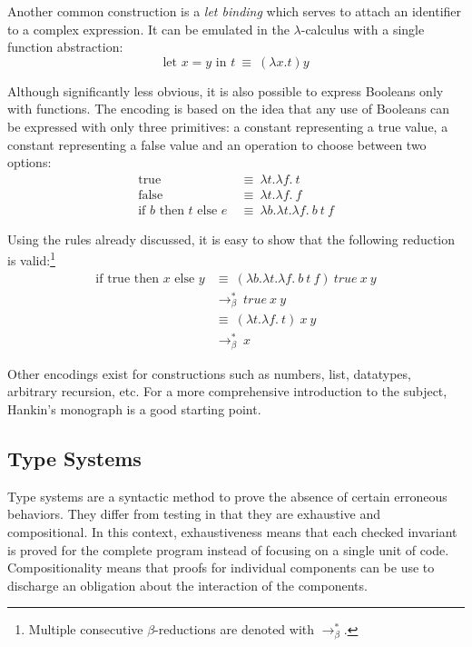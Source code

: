 Another common construction is a \emph{let binding} which serves to attach an identifier to a
complex expression. It can be emulated in the $\lambda$-calculus with a single function abstraction:
\begin{displaymath}
  \text{let } x = y \text{ in } t \: \equiv \: (\lambda x. t) y
\end{displaymath}

Although significantly less obvious, it is also possible to express Booleans only with functions.
The encoding is based on the idea that any use of Booleans can be expressed with only three
primitives: a constant representing a true value, a constant representing a false value and an
operation to choose between two options:
\begin{align*}
  \text{true}
    & \: \equiv \: \lambda t. \lambda f. \ t \\
  \text{false}
    & \: \equiv \: \lambda t. \lambda f. \ f \\
  \text{if } b \text{ then } t \text{ else } e
    & \: \equiv \: \lambda b. \lambda t. \lambda f. \ b \ t \ f
\end{align*}

Using the rules already discussed, it is easy to show that the following reduction is
valid:\footnote{Multiple consecutive $\beta$-reductions are denoted with $\to_\beta^*$.}
\begin{align*}
  \text{if true then } x \text{ else } y
    & \equiv \: (\lambda b. \lambda t. \lambda f. \ b \ t \ f) \ true \ x \ y \\
    & \to_\beta^* \: true \ x \ y \\
    & \equiv \: (\lambda t. \lambda f. \ t) \ x \ y \\
    & \to_\beta^* \: x
\end{align*}

Other encodings exist for constructions such as numbers, list, datatypes, arbitrary recursion, etc.
For a more comprehensive introduction to the subject, Hankin's monograph \cite{hankin-2004-ILCCS} is
a good starting point.

\subsection{Type Systems}

Type systems are a syntactic method to prove the absence of certain erroneous behaviors. They differ
from testing in that they are exhaustive and compositional. In this context, exhaustiveness means
that each checked invariant is proved for the complete program instead of focusing on a single unit
of code. Compositionality means that proofs for individual components can be use to discharge an
obligation about the interaction of the components.

